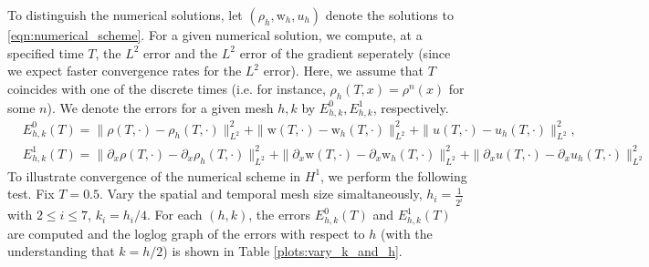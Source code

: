 \documentclass[11pt,letterpaper]{amsart}
\theoremstyle{plain}
\theoremstyle{definition}
\theoremstyle{remark}
\renewcommand{\leq}{\leqslant}
\def \wt {\mathrm{w}}
\begin{document}
        
        To distinguish the numerical solutions, let $(\rho_h, \wt_h, u_h)$ denote the solutions to \eqref{eqn:numerical_scheme}. 
        For a given numerical solution, we compute, at a specified time $T$, the $L^2$ error and the $L^2$ error of the gradient seperately (since 
        we expect faster convergence rates for the $L^2$ error).  Here, we assume that $T$ coincides with one of the discrete times (i.e. 
        for instance, $\rho_h(T, x) = \rho^n(x)$ for some $n$).  We denote the errors for a given mesh $h,k$ by $E_{h,k}^0, E_{h,k}^1$, respectively. 
        \begin{align*}
            &E_{h,k}^0(T) = \|\rho(T, \cdot) - \rho_h(T, \cdot)\|_{L^2}^2 +  \|\wt(T, \cdot) - \wt_h(T, \cdot)\|_{L^2}^2  +  \|u(T, \cdot) - u_h(T, \cdot)\|_{L^2}^2, \\
            &E_{h,k}^1(T) = \|\partial_x \rho(T, \cdot) - \partial_x \rho_h(T, \cdot) \|_{L^2}^2 +  \|\partial_x \wt(T, \cdot) - \partial_x \wt_h(T, \cdot) \|_{L^2}^2  +  \| \partial_x u(T, \cdot) - \partial_x u_h(T, \cdot) \|_{L^2}^2
        \end{align*}
        To illustrate convergence of the numerical scheme in $H^1$, we perform the following test. 
        Fix $T = 0.5$.  Vary the spatial and temporal mesh size simaltaneously, $h_i = \frac{1}{2^i}$ with $2 \leq i \leq 7$, $k_i = h_i/4$. 
        For each $(h,k)$, the errors $E_{h,k}^0(T)$ and $E_{h,k}^1(T)$ are computed and the loglog graph of the errors with respect to $h$ (with the understanding that $k = h/2$) is shown in Table \ref{plots:vary_k_and_h}. 
\end{document}
